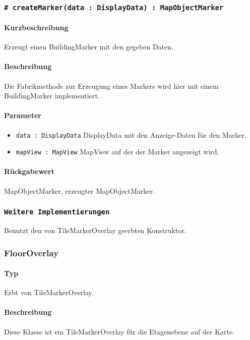 \subsubsection*{\texttt{\# createMarker(data : DisplayData) : MapObjectMarker}}%
\paragraph*{Kurzbeschreibung}
Erzeugt einen BuildingMarker mit den gegeben Daten.
\paragraph*{Beschreibung}
Die Fabrikmethode zur Erzeugung eines Markers wird hier mit einem BuildingMarker implementiert.
\paragraph*{Parameter}
\begin{itemize}
    \item \texttt{data : DisplayData} DisplayData mit den Anzeige-Daten für den Marker.
    \item \texttt{mapView : MapView} MapView auf der der Marker angezeigt wird.
\end{itemize}
\paragraph*{Rückgabewert}
MapObjectMarker, erzeugter MapObjectMarker.

\subsubsection*{\texttt{Weitere Implementierungen}}%
Benutzt den von TileMarkerOverlay geerbten Konstruktor.

\subsubsection{FloorOverlay}
\paragraph*{Typ}
Erbt von TileMarkerOverlay.
\paragraph*{Beschreibung}
Diese Klasse ist ein TileMarkerOverlay für die Etagenebene auf der Karte.

